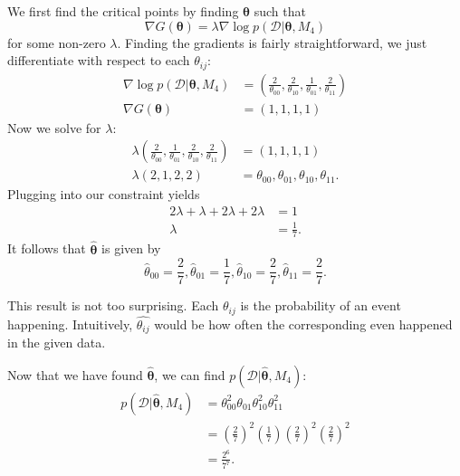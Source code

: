 \documentclass[a4paper,11pt]{article}
\begin{document}
We first find the critical points by finding $\boldsymbol{\theta}$ such that
\[
    \nabla G(\boldsymbol{\theta}) = \lambda\nabla
    \log p(\mathcal{D}|\boldsymbol{\theta},M_4)
\]
for some non-zero $\lambda$.
Finding the gradients is fairly straightforward, we just differentiate with
respect to each $\theta_{ij}$:
\begin{equation*}\begin{split}
    \nabla \log p(\mathcal{D}|\boldsymbol{\theta}, M_4) &=
    \left(\frac{2}{\theta_{00}}, \frac{2}{\theta_{10}},
    \frac{1}{\theta_{01}}, \frac{2}{\theta_{11}}\right) \\
    \nabla G(\boldsymbol{\theta}) &= (1,1,1,1)
\end{split}\end{equation*}
Now we solve for $\lambda$:
\begin{align}
    \lambda\left(\frac{2}{\theta_{00}}, \frac{1}{\theta_{01}},
    \frac{2}{\theta_{10}}, \frac{2}{\theta_{11}}\right) &=
    (1,1,1,1)\\
    \lambda(2,1,2,2) &= {\theta_{00},\theta_{01},\theta_{10},\theta_{11}}.
\end{align}
Plugging into our constraint yields
\begin{equation}\begin{split}
    2\lambda + \lambda + 2\lambda + 2\lambda &= 1 \\
    \lambda &= \frac{1}{7}.
\end{split}\end{equation}
It follows that $\hat{\boldsymbol{\theta}}$ is given by
\[
    \hat{\theta}_{00}=\frac{2}{7},
    \hat{\theta}_{01}=\frac{1}{7},
    \hat{\theta}_{10}=\frac{2}{7},
    \hat{\theta}_{11}=\frac{2}{7}.
\]

\indent This result is not too surprising. Each $\theta_{ij}$ is the
probability of an event happening.
Intuitively, $\hat{\theta_{ij}}$ would be how often the corresponding even
happened in the given data.

Now that we have found $\hat{\boldsymbol{\theta}}$,
we can find $p(\mathcal{D}|\hat{\boldsymbol{\theta}}, M_4)$:
\begin{align*}
    p(\mathcal{D}|\hat{\boldsymbol{\theta}}, M_4) &=
    \theta_{00}^2\theta_{01}\theta_{10}^2\theta_{11}^2 \\
    &= {\left(\frac{2}{7}\right)}^2
       \left(\frac{1}{7}\right)
       {\left(\frac{2}{7}\right)}^2
       {\left(\frac{2}{7}\right)}^2 \\
    &= \frac{2^6}{7^7}.
\end{align*}
\end{document}
